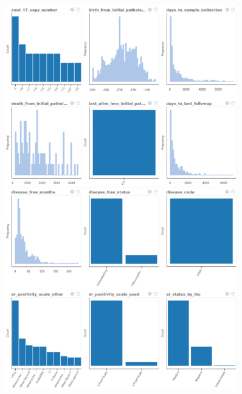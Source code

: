 \begin{figure}
	\includegraphics[width=0.9\textwidth]{NOTEBOOK/IMAGES_EDA/3}
	\includegraphics[width=0.9\textwidth]{NOTEBOOK/IMAGES_EDA/4}
\end{figure}

